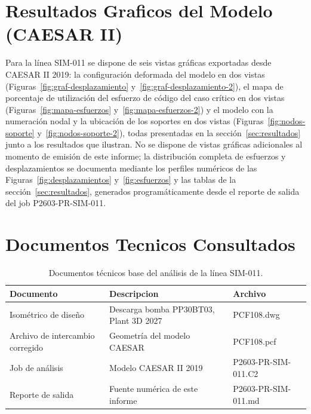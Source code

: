 \appendix
\section{Resultados Graficos del Modelo (CAESAR II)}
\label{appendix:graficos}

Para la l\'{i}nea SIM-011 se dispone de seis vistas gr\'{a}ficas exportadas
desde CAESAR II 2019: la configuraci\'{o}n deformada del modelo en dos vistas
(Figuras~\ref{fig:graf-desplazamiento} y~\ref{fig:graf-desplazamiento-2}), el
mapa de porcentaje de utilizaci\'{o}n del esfuerzo de c\'{o}digo del caso
cr\'{i}tico en dos vistas (Figuras~\ref{fig:mapa-esfuerzos}
y~\ref{fig:mapa-esfuerzos-2}) y el modelo con la numeraci\'{o}n nodal y la
ubicaci\'{o}n de los soportes en dos vistas (Figuras~\ref{fig:nodos-soporte}
y~\ref{fig:nodos-soporte-2}), todas presentadas en la
secci\'{o}n~\ref{sec:resultados} junto a los resultados que ilustran. No se
dispone de vistas gr\'{a}ficas adicionales al momento de emisi\'{o}n de este
informe; la distribuci\'{o}n completa de esfuerzos y desplazamientos se
documenta mediante los perfiles num\'{e}ricos de las
Figuras~\ref{fig:desplazamientos} y~\ref{fig:esfuerzos} y las tablas de la
secci\'{o}n~\ref{sec:resultados}, generados program\'{a}ticamente desde el
reporte de salida del job P2603-PR-SIM-011.

\section{Documentos Tecnicos Consultados}
\label{appendix:documentos}

\begin{table}[htbp]
    \centering
    \small
    \caption{Documentos t\'{e}cnicos base del an\'{a}lisis de la l\'{i}nea SIM-011.}
    \label{tab:planos}
    \begin{tabular}{@{}lll@{}}
        \toprule
        \textbf{Documento} & \textbf{Descripcion} & \textbf{Archivo} \\
        \midrule
        Isom\'{e}trico de dise\~{n}o & Descarga bomba PP30BT03, Plant 3D 2027 & PCF108.dwg \\
        Archivo de intercambio corregido & Geometr\'{i}a del modelo CAESAR & PCF108.pcf \\
        Job de an\'{a}lisis & Modelo CAESAR II 2019 & P2603-PR-SIM-011.C2 \\
        Reporte de salida & Fuente num\'{e}rica de este informe & P2603-PR-SIM-011.md \\
        \bottomrule
    \end{tabular}
\end{table}
